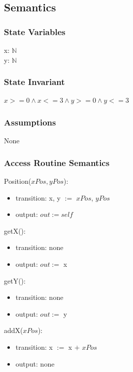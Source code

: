 \documentclass[12pt]{article}
\begin{document}
\subsection* {Semantics}

\subsubsection* {State Variables}

x: $\mathbb{N}$\\
y: $\mathbb{N}$\\

\subsubsection* {State Invariant}

$x >= 0 \land x <= 3 \land y >= 0 \land y <= 3$

\subsubsection* {Assumptions}

None

\subsubsection* {Access Routine Semantics}

\noindent Position($xPos, yPos$):
\begin{itemize}
\item transition: x, y $:=$ $xPos$, $yPos$
\item output: $out := \mathit{self}$
\end{itemize}

\noindent getX():
\begin{itemize}
\item transition: none
\item output: $out := $ x
\end{itemize}

\noindent getY():
\begin{itemize}
\item transition: none
\item output: $out := $ y
\end{itemize}

\noindent addX($xPos$):
\begin{itemize}
\item transition: x $:=$ x $+$ $xPos$
\item output: none
\end{itemize}
\end{document}
